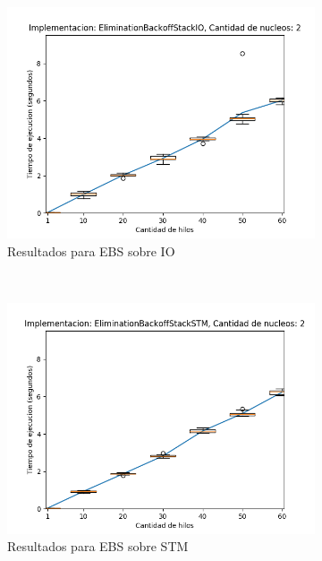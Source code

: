 \clearpage
\begin{figure}[!h]
    \centering
    \begin{subfigure}[b]{0.49\textwidth}
        \includegraphics[width=\textwidth]{images/numberOfThreads/plots/expEBSIO-2}
        \caption{Resultados para EBS sobre IO}
        \label{subfig:numberOfThreads-ebsio-2}
    \end{subfigure}
    ~
    \begin{subfigure}[b]{0.49\textwidth}
        \includegraphics[width=\textwidth]{images/numberOfThreads/plots/expEBSSTM-2}
        \caption{Resultados para EBS sobre STM}
        \label{subfig:numberOfThreads-ebsstm-2}
    \end{subfigure}
    \begin{subfigure}[b]{0.49\textwidth}

\end{subfigure}
\end{figure}
